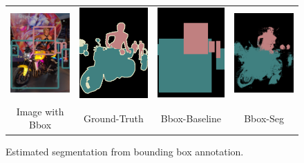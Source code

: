 \begin{figure}
  \centering
  \begin{tabular}{c c c c}
    \includegraphics[width=0.21\linewidth]{fig/erode_bbox/img/2009_002382.jpg} & 
    \includegraphics[width=0.21\linewidth]{fig/erode_bbox/gt/2009_002382.png} & 
    \includegraphics[width=0.21\linewidth]{fig/erode_bbox/bbox/2009_002382.png} & 
    \includegraphics[width=0.21\linewidth]{fig/erode_bbox/crf/2009_002382.png} \\    
    {\scriptsize Image with Bbox} & {\scriptsize Ground-Truth} & {\scriptsize Bbox-Baseline} & {\scriptsize Bbox-Seg}
  \end{tabular}
  \caption{Estimated segmentation from bounding box annotation.%
  }
  \label{fig:bbox_illustration}
\end{figure}


